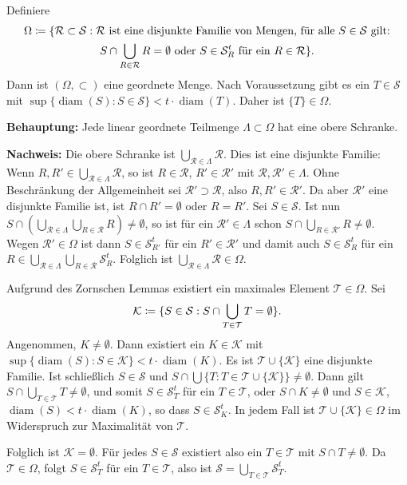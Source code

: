 \documentclass[a4paper,twoside,DIV15,BCOR12mm]{scrbook}
\DeclareMathOperator{\diam}{diam}
\begin{document}
\begin{beweis}
Definiere
\begin{multline*}
\Omega \da \{\mathcal R\subset \mathcal S: \mathcal R \text{ ist eine disjunkte Familie von Mengen, für alle $S\in\mathcal S$ gilt:}\\
S\cap \bigcup_{R\in\mathcal R}R = \emptyset \text{ oder }
S\in \mathcal S_R^t \text{ für ein } R\in\mathcal R\}.
\end{multline*}
Dann ist $(\Omega,\subset)$ eine geordnete Menge. Nach Voraussetzung gibt es ein $T\in \mathcal S$ mit $\sup\{\diam(S): S\in \mathcal S\} < t \cdot \diam (T)$. Daher ist $\{T\}\in\Omega$.

\textbf{Behauptung:} Jede linear geordnete Teilmenge $\Lambda \subset \Omega$ hat eine obere Schranke.

\textbf{Nachweis:} Die obere Schranke ist $\bigcup_{\mathcal R\in \Lambda}\mathcal R$. Dies ist eine disjunkte Familie: Wenn $R,R'\in \bigcup_{\mathcal R\in\Lambda}\mathcal R$, so ist $R\in \mathcal R$, $R'\in \mathcal R'$ mit $\mathcal R,\mathcal R'\in\Lambda$. Ohne Beschränkung der Allgemeinheit sei $\mathcal R'\supset \mathcal R$, also $R,R'\in \mathcal R'$. Da aber $\mathcal R'$ eine disjunkte Familie ist, ist $R\cap R'=\emptyset$ oder $R=R'$. Sei $S\in \mathcal S$. Ist nun $S\cap(\bigcup_{\mathcal{R}\in\Lambda} \bigcup_{R\in\mathcal R} R) \ne \emptyset$, so ist für ein $\mathcal R'\in\Lambda$ schon $S\cap \bigcup_{R\in\mathcal R'} R \ne \emptyset$. Wegen $\mathcal R'\in\Omega$ ist dann $S\in\mathcal S_{R'}^t$ für ein $R'\in\mathcal R'$ und damit auch $S\in\mathcal S_R^t$ für ein $R\in\bigcup_{\mathcal R\in\Lambda}\bigcup_{R\in\mathcal R}\mathcal S_R^t$. Folglich ist $\bigcup_{\mathcal R\in\Lambda}\mathcal R\in \Omega$.

Aufgrund des Zornschen Lemmas existiert ein maximales Element $\mathcal T\in\Omega$. Sei
\[
\mathcal K\da \{S\in\mathcal S: S\cap \bigcup_{T\in\mathcal T}T = \emptyset\}.
\]
Angenommen, $K\ne \emptyset$. Dann existiert ein $K\in\mathcal K$ mit $\sup\{\diam(S):S\in\mathcal K\}<t\cdot\diam(K)$. Es ist $\mathcal T\cup\{\mathcal K\}$ eine disjunkte Familie. Ist schließlich $S\in\mathcal S$ und $S\cap \bigcup\{T: T\in\mathcal T\cup\{\mathcal K\}\} \ne \emptyset$. Dann gilt $S\cap \bigcup_{T\in\mathcal T}T \ne \emptyset$, und somit $S\in \mathcal S_T^t$ für ein $T\in\mathcal T$, oder $S\cap K\ne\emptyset$ und $S\in\mathcal K$, $\diam(S)<t\cdot \diam(K)$, so dass $S\in\mathcal S_K^t$. In jedem Fall ist $\mathcal T\cup\{\mathcal K\}\in\Omega$ im Widerspruch zur Maximalität von $\mathcal T$.

Folglich ist $\mathcal K=\emptyset$. Für jedes $S\in\mathcal S$ existiert also ein $T\in\mathcal T$ mit $S\cap T\ne\emptyset$. Da $\mathcal T\in\Omega$, folgt $S\in\mathcal S_T^t$ für ein $T\in\mathcal T$, also ist $\mathcal S=\bigcup_{T\in\mathcal T}\mathcal S_T^t$.
\end{beweis}
\end{document}
